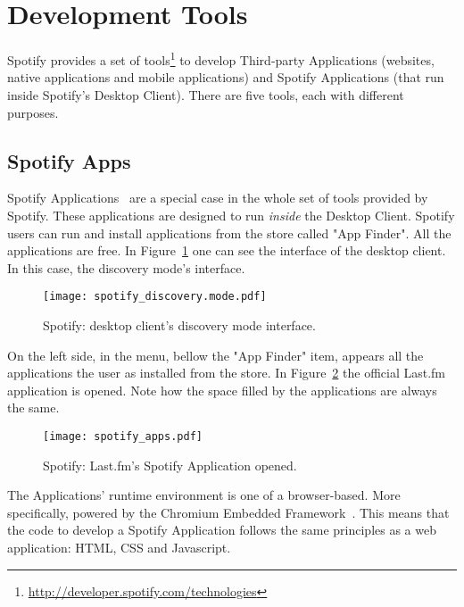 

  \section{Development Tools} %
  \label{sec:devtools}
  
    Spotify provides a set of tools\footnote{\url{http://developer.spotify.com/technologies}} to develop Third-party Applications (websites, native applications and mobile applications) and Spotify Applications (that run inside Spotify's Desktop Client).
    There are five tools, each with different purposes.

    \subsection{Spotify Apps} %
    \label{sub:spotify_apps}
      Spotify Applications~\cite{spotifyapps} are a special case in the whole set of tools provided by Spotify.
      These applications are designed to run \emph{inside} the Desktop Client.
      Spotify users can run and install applications from the store called "App Finder".
      All the applications are free.
      In Figure~\ref{fig:spotify_apps} one can see the interface of the desktop client.
      In this case, the discovery mode's interface.
      \begin{figure}
        \begin{center}
          \texttt{[image: spotify\_discovery.mode.pdf]}
        \end{center}
        \caption{Spotify: desktop client's discovery mode interface.}
        \label{fig:spotify_apps}
      \end{figure}
      On the left side, in the menu, bellow the "App Finder" item, appears all the applications the user as installed from the store.
      In Figure~\ref{fig:spotify_apps2} the official Last.fm application is opened.
      Note how the space filled by the applications are always the same.

      \begin{figure}
        \begin{center}
          \texttt{[image: spotify\_apps.pdf]}
        \end{center}
        \caption{Spotify: Last.fm's Spotify Application opened.}
        \label{fig:spotify_apps2}
      \end{figure}

      The Applications' runtime environment is one of a browser-based.
      More specifically, powered by the Chromium Embedded Framework~\cite{chromiumembedded}.
      This means that the code to develop a Spotify Application follows the same principles as a web application: HTML, CSS and Javascript.

